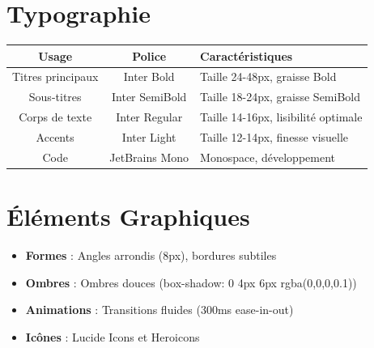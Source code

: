 \documentclass[12pt,a4paper,oneside]{book}
\begin{document}
\section{Typographie}
\bigskip
\begin{center}
\begin{tabular}{|c|c|p{6cm}|}
\hline
\rowcolor{electronpurple}
\color{white}\textbf{Usage} & \color{white}\textbf{Police} & \color{white}\textbf{Caractéristiques} \\
\hline
Titres principaux & Inter Bold & Taille 24-48px, graisse Bold \\
\hline
Sous-titres & Inter SemiBold & Taille 18-24px, graisse SemiBold \\
\hline
Corps de texte & Inter Regular & Taille 14-16px, lisibilité optimale \\
\hline
Accents & Inter Light & Taille 12-14px, finesse visuelle \\
\hline
Code & JetBrains Mono & Monospace, développement \\
\hline
\end{tabular}
\end{center}

\section{Éléments Graphiques}
\begin{itemize}
\item \textbf{Formes} : Angles arrondis (8px), bordures subtiles
\item \textbf{Ombres} : Ombres douces (box-shadow: 0 4px 6px rgba(0,0,0,0.1))
\item \textbf{Animations} : Transitions fluides (300ms ease-in-out)
\item \textbf{Icônes} : Lucide Icons et Heroicons
\end{itemize}

\appendix
\end{document}
